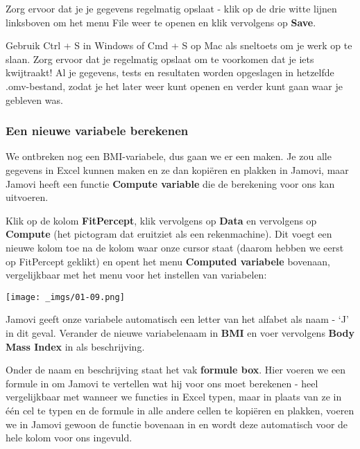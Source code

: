 \documentclass[
  letterpaper,
  DIV=11,
  numbers=noendperiod]{scrartcl}
\begin{document}
Zorg ervoor dat je je gegevens regelmatig opslaat - klik op de drie
witte lijnen linksboven om het menu File weer te openen en klik
vervolgens op \textbf{Save}.

\begin{tcolorbox}[beforeafter skip=1cm, ignore nobreak=true, breakable, colframe=Tip-frame, colback=Tip-bg, coltext=Tip-text, boxsep=2mm, arc=0mm, boxrule=0.5mm]

Gebruik Ctrl + S in Windows of Cmd + S op Mac als sneltoets om je werk
op te slaan. Zorg ervoor dat je regelmatig opslaat om te voorkomen dat
je iets kwijtraakt! Al je gegevens, tests en resultaten worden
opgeslagen in hetzelfde .omv-bestand, zodat je het later weer kunt
openen en verder kunt gaan waar je gebleven was.

\end{tcolorbox}

\hypertarget{een-nieuwe-variabele-berekenen}{%
\subsubsection{Een nieuwe variabele
berekenen}\label{een-nieuwe-variabele-berekenen}}

We ontbreken nog een BMI-variabele, dus gaan we er een maken. Je zou
alle gegevens in Excel kunnen maken en ze dan kopiëren en plakken in
Jamovi, maar Jamovi heeft een functie \textbf{Compute variable} die de
berekening voor ons kan uitvoeren.

Klik op de kolom \textbf{FitPercept}, klik vervolgens op \textbf{Data}
en vervolgens op \textbf{Compute} (het pictogram dat eruitziet als een
rekenmachine). Dit voegt een nieuwe kolom toe na de kolom waar onze
cursor staat (daarom hebben we eerst op FitPercept geklikt) en opent het
menu \textbf{Computed variabele} bovenaan, vergelijkbaar met het menu
voor het instellen van variabelen:

\texttt{[image: \_imgs/01-09.png]}

Jamovi geeft onze variabele automatisch een letter van het alfabet als
naam - `J' in dit geval. Verander de nieuwe variabelenaam in
\textbf{BMI} en voer vervolgens \textbf{Body Mass Index} in als
beschrijving.

Onder de naam en beschrijving staat het vak \textbf{formule box}. Hier
voeren we een formule in om Jamovi te vertellen wat hij voor ons moet
berekenen - heel vergelijkbaar met wanneer we functies in Excel typen,
maar in plaats van ze in één cel te typen en de formule in alle andere
cellen te kopiëren en plakken, voeren we in Jamovi gewoon de functie
bovenaan in en wordt deze automatisch voor de hele kolom voor ons
ingevuld.
\end{document}
